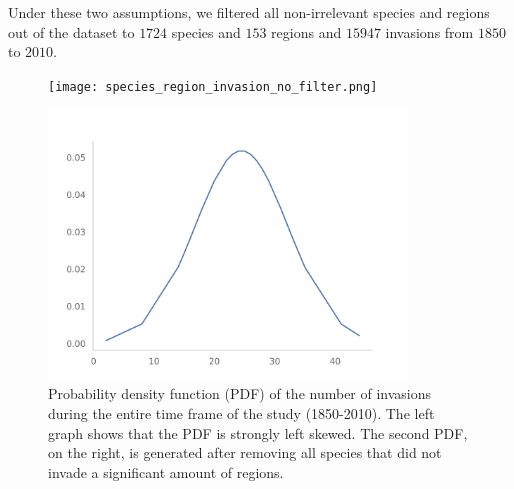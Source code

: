\documentclass[mscthesis]{usiinfthesis}
\begin{document}



Under these two assumptions, we filtered all non-irrelevant species and regions out of the dataset to $1724$ species and $153$ regions and $15947$ invasions from $1850$ to $2010$.


 
\begin{figure}
\centering
\begin{minipage}{.5\textwidth}
  \centering
    \texttt{[image: species\_region\_invasion\_no\_filter.png]}
\end{minipage}%
\begin{minipage}{.5\textwidth}
  \centering
    \includegraphics[width=0.85\textwidth]{species_region_invasion.png}
\end{minipage}
\caption{Probability density function (PDF) of the number of invasions during the entire time frame of the study (1850-2010). The left graph shows that the PDF is strongly left skewed. The second PDF, on the right, is generated after removing all species that did not invade a significant amount of regions.}
\label{fig:pdf_invasion}
\end{figure}
\end{document}
